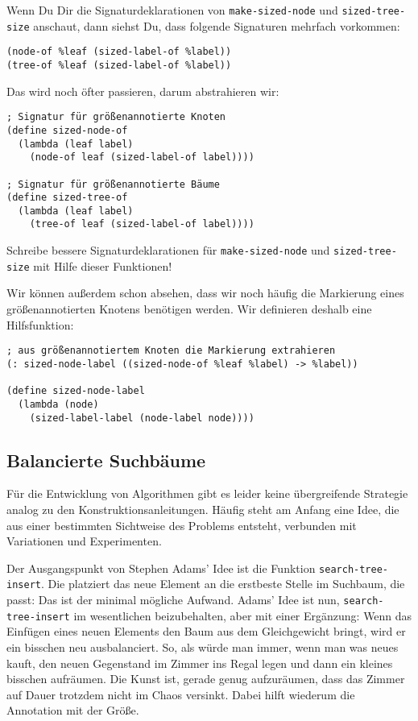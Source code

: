 Wenn Du Dir die Signaturdeklarationen von \lstinline{make-sized-node}
und \lstinline{sized-tree-size} anschaut, dann siehst Du, dass
folgende Signaturen mehrfach vorkommen:
%
\begin{lstlisting}
(node-of %leaf (sized-label-of %label))
(tree-of %leaf (sized-label-of %label))
\end{lstlisting}
%
Das wird noch öfter passieren, darum abstrahieren wir:
%
\begin{lstlisting}
; Signatur für größenannotierte Knoten
(define sized-node-of
  (lambda (leaf label)
    (node-of leaf (sized-label-of label))))

; Signatur für größenannotierte Bäume
(define sized-tree-of
  (lambda (leaf label)
    (tree-of leaf (sized-label-of label))))
\end{lstlisting}
%
\begin{aufgabeinline}
  Schreibe bessere Signaturdeklarationen für
  \lstinline{make-sized-node} und \lstinline{sized-tree-size} mit
  Hilfe dieser Funktionen!
\end{aufgabeinline}
%
Wir können außerdem schon absehen, dass wir noch häufig die Markierung
eines größenannotierten Knotens benötigen werden.  
Wir definieren deshalb eine Hilfsfunktion:
%
\begin{lstlisting}
; aus größenannotiertem Knoten die Markierung extrahieren
(: sized-node-label ((sized-node-of %leaf %label) -> %label))

(define sized-node-label
  (lambda (node)
    (sized-label-label (node-label node))))
\end{lstlisting}

\subsection{Balancierte Suchbäume}
\label{sec:balanced-search-trees}

Für die Entwicklung von Algorithmen gibt es leider keine übergreifende
Strategie analog zu den Konstruktionsanleitungen. Häufig steht am
Anfang eine Idee, die aus einer bestimmten Sichtweise des
Problems entsteht, verbunden mit Variationen und Experimenten.

Der Ausgangspunkt von Stephen Adams' Idee ist die Funktion
\lstinline{search-tree-insert}.  Die platziert das neue Element an die
erstbeste Stelle im Suchbaum, die passt: Das ist der minimal mögliche
Aufwand.  Adams' Idee ist nun, \lstinline{search-tree-insert} im
wesentlichen beizubehalten, aber mit einer Ergänzung: Wenn das
Einfügen eines neuen Elements den Baum aus dem Gleichgewicht bringt,
wird er ein bisschen neu ausbalanciert.
So, als würde man immer, wenn man was neues kauft, den neuen
Gegenstand im Zimmer ins Regal legen und dann ein kleines bisschen
aufräumen.  Die Kunst ist, gerade genug aufzuräumen, dass das Zimmer
auf Dauer trotzdem nicht im Chaos versinkt.  Dabei hilft wiederum die
Annotation mit der Größe.

